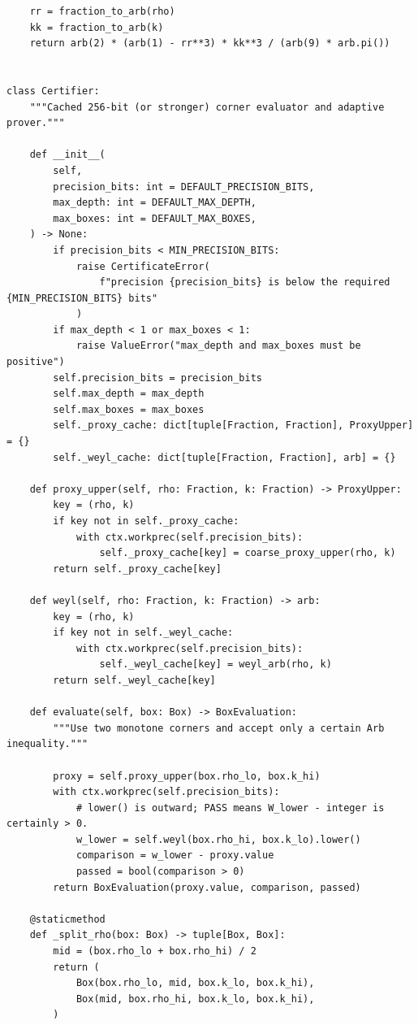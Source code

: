 \documentclass[11pt]{article}
\numberwithin{equation}{section}
\theoremstyle{definition}
\theoremstyle{remark}
\begin{document}
\begin{lstlisting}
    rr = fraction_to_arb(rho)
    kk = fraction_to_arb(k)
    return arb(2) * (arb(1) - rr**3) * kk**3 / (arb(9) * arb.pi())


class Certifier:
    """Cached 256-bit (or stronger) corner evaluator and adaptive prover."""

    def __init__(
        self,
        precision_bits: int = DEFAULT_PRECISION_BITS,
        max_depth: int = DEFAULT_MAX_DEPTH,
        max_boxes: int = DEFAULT_MAX_BOXES,
    ) -> None:
        if precision_bits < MIN_PRECISION_BITS:
            raise CertificateError(
                f"precision {precision_bits} is below the required {MIN_PRECISION_BITS} bits"
            )
        if max_depth < 1 or max_boxes < 1:
            raise ValueError("max_depth and max_boxes must be positive")
        self.precision_bits = precision_bits
        self.max_depth = max_depth
        self.max_boxes = max_boxes
        self._proxy_cache: dict[tuple[Fraction, Fraction], ProxyUpper] = {}
        self._weyl_cache: dict[tuple[Fraction, Fraction], arb] = {}

    def proxy_upper(self, rho: Fraction, k: Fraction) -> ProxyUpper:
        key = (rho, k)
        if key not in self._proxy_cache:
            with ctx.workprec(self.precision_bits):
                self._proxy_cache[key] = coarse_proxy_upper(rho, k)
        return self._proxy_cache[key]

    def weyl(self, rho: Fraction, k: Fraction) -> arb:
        key = (rho, k)
        if key not in self._weyl_cache:
            with ctx.workprec(self.precision_bits):
                self._weyl_cache[key] = weyl_arb(rho, k)
        return self._weyl_cache[key]

    def evaluate(self, box: Box) -> BoxEvaluation:
        """Use two monotone corners and accept only a certain Arb inequality."""

        proxy = self.proxy_upper(box.rho_lo, box.k_hi)
        with ctx.workprec(self.precision_bits):
            # lower() is outward; PASS means W_lower - integer is certainly > 0.
            w_lower = self.weyl(box.rho_hi, box.k_lo).lower()
            comparison = w_lower - proxy.value
            passed = bool(comparison > 0)
        return BoxEvaluation(proxy.value, comparison, passed)

    @staticmethod
    def _split_rho(box: Box) -> tuple[Box, Box]:
        mid = (box.rho_lo + box.rho_hi) / 2
        return (
            Box(box.rho_lo, mid, box.k_lo, box.k_hi),
            Box(mid, box.rho_hi, box.k_lo, box.k_hi),
        )


\end{lstlisting}
\end{document}
